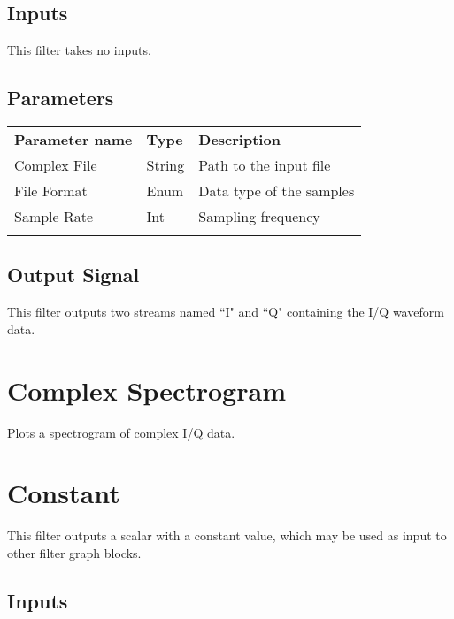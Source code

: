 \subsection{Inputs}

This filter takes no inputs.

\subsection{Parameters}

\begin{tabularx}{16cm}{llX}
\thickhline
\textbf{Parameter name} & \textbf{Type} & \textbf{Description} \\
\thickhline
Complex File & String & Path to the input file\\
\thinhline
File Format & Enum & Data type of the samples\\
\thinhline
Sample Rate & Int & Sampling frequency\\
\thickhline
\end{tabularx}

\subsection{Output Signal}

This filter outputs two streams named ``I" and ``Q" containing the I/Q waveform data.

\pagebreak
\section{Complex Spectrogram}

Plots a spectrogram of complex I/Q data.

\pagebreak
\section{Constant}
\label{filter:constant}

This filter outputs a scalar with a constant value, which may be used as input to other filter graph blocks.

\subsection{Inputs}

